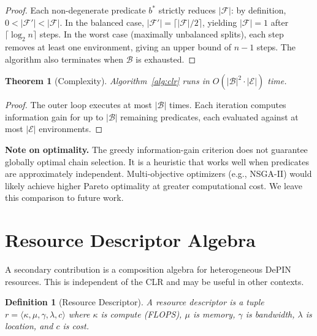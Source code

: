 \documentclass[conference, 10pt, twocolumn]{IEEEtran}
\newtheorem{definition}{Definition}
\newtheorem{theorem}{Theorem}
\begin{document}
\begin{proof}
Each non-degenerate predicate $b^*$ strictly reduces $|\mathcal{F}|$:
by definition, $0 < |\mathcal{F}'| < |\mathcal{F}|$.  In the
balanced case, $|\mathcal{F}'| = \lceil |\mathcal{F}|/2 \rceil$,
yielding $|\mathcal{F}| = 1$ after $\lceil \log_2 n \rceil$ steps.
In the worst case (maximally unbalanced splits), each step removes at
least one environment, giving an upper bound of $n-1$ steps.  The
algorithm also terminates when $\mathcal{B}$ is exhausted.
\end{proof}

\begin{theorem}[Complexity]
\label{thm:complexity}
Algorithm~\ref{alg:clr} runs in $O(|\mathcal{B}|^2 \cdot
|\mathcal{E}|)$ time.
\end{theorem}

\begin{proof}
The outer loop executes at most $|\mathcal{B}|$ times.  Each
iteration computes information gain for up to $|\mathcal{B}|$
remaining predicates, each evaluated against at most $|\mathcal{E}|$
environments.
\end{proof}

\textbf{Note on optimality.}  The greedy information-gain criterion
does not guarantee globally optimal chain selection.  It is a
heuristic that works well when predicates are approximately
independent.  Multi-objective optimizers (e.g., NSGA-II) would likely
achieve higher Pareto optimality at greater computational cost.  We
leave this comparison to future work.

\section{Resource Descriptor Algebra}
\label{sec:resources}

A secondary contribution is a composition algebra for heterogeneous
DePIN resources.  This is independent of the CLR and may be useful in
other contexts.

\begin{definition}[Resource Descriptor]
A \emph{resource descriptor} is a tuple $r = \langle \kappa, \mu,
\gamma, \lambda, c \rangle$ where $\kappa$ is compute (FLOPS), $\mu$
is memory, $\gamma$ is bandwidth, $\lambda$ is location, and $c$ is
cost.
\end{definition}
\end{document}
